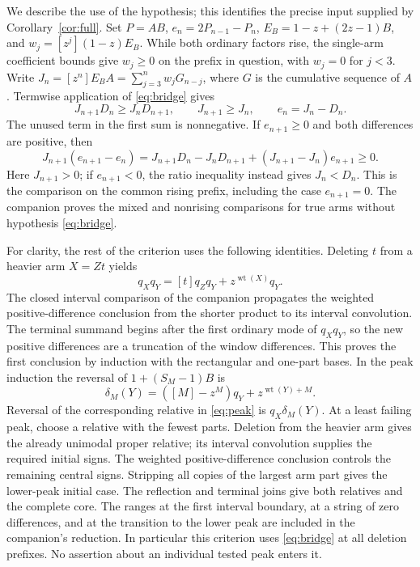 \documentclass[11pt]{article}
\newcommand{\wt}{\operatorname{wt}}
\begin{document}
We describe the use of the hypothesis; this identifies the precise
input supplied by Corollary~\ref{cor:full}. Set \(P=AB\),
\(e_n=2P_{n-1}-P_n\), \(E_B=1-z+(2z-1)B\), and \(w_j=[z^j](1-z)E_B\).
While both ordinary factors rise, the single-arm coefficient bounds
give \(w_j\ge0\) on the prefix in question, with \(w_j=0\) for \(j<3\).
Write \(J_n=[z^n]E_BA=\sum_{j=3}^nw_jG_{n-j}\), where \(G\) is the
cumulative sequence of \(A\). Termwise application of \eqref{eq:bridge}
gives
\[
        J_{n+1}D_n\ge J_nD_{n+1},\qquad J_{n+1}\ge J_n,
        \qquad e_n=J_n-D_n .
\]
The unused term in the first sum is nonnegative. If \(e_{n+1}\ge0\)
and both differences are positive, then
\[
 J_{n+1}(e_{n+1}-e_n)
    =J_{n+1}D_n-J_nD_{n+1}
      +(J_{n+1}-J_n)e_{n+1}\ge0.
\]
Here \(J_{n+1}>0\); if \(e_{n+1}<0\), the ratio inequality instead gives
\(J_n<D_n\). This is the comparison on the common rising prefix, including
the case \(e_{n+1}=0\). The companion proves the mixed and nonrising
comparisons for true arms without hypothesis \eqref{eq:bridge}.

For clarity, the rest of the criterion uses the following identities.
Deleting \(t\) from a heavier arm \(X=Zt\) yields
\[
           q_Xq_Y=[t]q_Zq_Y+z^{\wt(X)}q_Y .
\]
The closed interval comparison of the companion propagates the weighted
positive-difference conclusion from the shorter product to its interval
convolution. The terminal summand begins after the first ordinary mode
of \(q_Xq_Y\), so the new positive differences are a truncation of the
window differences. This proves the first conclusion by induction with
the rectangular and one-part bases. In the peak induction the reversal
of \(1+(S_M-1)B\) is
\[
               \delta_M(Y)=([M]-z^M)q_Y+z^{\wt(Y)+M}.
\]
Reversal of the corresponding relative in \eqref{eq:peak} is
\(q_X\delta_M(Y)\). At a least failing peak, choose a relative with
the fewest parts. Deletion from the heavier arm gives the already
unimodal proper relative; its interval convolution supplies the required
initial signs. The weighted positive-difference conclusion controls
the remaining central signs. Stripping all copies of the largest arm
part gives the lower-peak initial case. The reflection and terminal
joins give both relatives and the complete core. The ranges at the
first interval boundary, at a string of zero differences, and at the
transition to the lower peak are included in the companion's reduction.
In particular this criterion uses \eqref{eq:bridge} at all deletion
prefixes. No assertion about an individual tested peak enters it.
\end{document}
